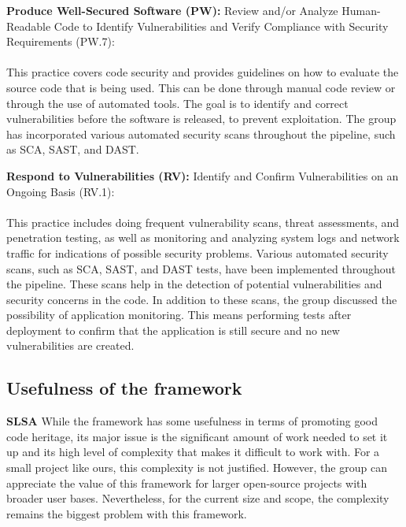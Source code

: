 \textbf{Produce Well-Secured Software (PW):} Review and/or Analyze Human-Readable
Code to Identify Vulnerabilities and Verify Compliance with Security Requirements (PW.7): \textit{}\cite{ssdf}
\\~\\
This practice covers code security and provides guidelines on how to evaluate the source code that is being used. This can be done through manual code review or through the use of automated tools.  The goal is to identify and correct vulnerabilities before the software is released, to prevent exploitation. The group has incorporated various automated security scans throughout the pipeline, such as SCA, SAST, and DAST. 


\textbf{Respond to Vulnerabilities (RV):}
Identify and Confirm Vulnerabilities on an Ongoing Basis (RV.1): \textit{}\cite{ssdf}
\\~\\This practice includes doing frequent vulnerability scans, threat assessments, and penetration testing, as well as monitoring and analyzing system logs and network traffic for indications of possible security problems. Various automated security scans, such as SCA, SAST, and DAST tests, have been implemented throughout the pipeline. These scans help in the detection of potential vulnerabilities and security concerns in the code. In addition to these scans, the group discussed the possibility of application monitoring. This means performing tests after deployment to confirm that the application is still secure and no new vulnerabilities are created. 

\subsection{Usefulness of the framework}
\textbf{SLSA}
While the framework has some usefulness in terms of promoting good code heritage, its major issue is the significant amount of work needed to set it up and its high level of complexity that makes it difficult to work with. For a small project like ours, this complexity is not justified. However, the group can appreciate the value of this framework for larger open-source projects with broader user bases. Nevertheless, for the current size and scope, the complexity remains the biggest problem with this framework.

